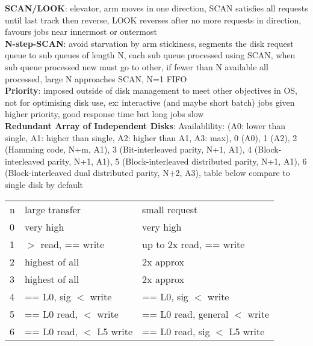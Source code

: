 \documentclass[a4paper]{article}
\begin{document}
\begin{multicols}{2}
        \textbf{SCAN/LOOK}: elevator, arm moves in one direction, SCAN satisfies all requests until last track then reverse, LOOK reverses after no more requests in direction, favours jobs near innermost or outermost\\
        \textbf{N-step-SCAN}: avoid starvation by arm stickiness, segments the disk request queue to sub queues of length N, each sub queue processed using SCAN, when sub queue processed new must go to other, if fewer than N available all processed, large N approaches SCAN, N=1 FIFO\\
        \textbf{Priority}: imposed outside of disk management to meet other objectives in OS, not for optimising disk use, ex: interactive (and maybe short batch) jobs given higher priority, good response time but long jobs slow\\
        \textbf{Redundant Array of Independent Disks}: Availablility: (A0: lower than single, A1: higher than single, A2: higher than A1, A3: max), 0 (A0), 1 (A2), 2 (Hamming code, N+m, A1), 3 (Bit-interleaved parity, N+1, A1), 4 (Block-interleaved parity, N+1, A1), 5 (Block-interleaved distributed parity, N+1, A1), 6 (Block-interleaved dual distributed parity, N+2, A3), table below compare to single disk by default\\
        \begin{tabular}{l l l}
            n & large transfer & small request\\
            0 & very high & very high\\
            1 & $>$ read, == write & up to 2x read, == write\\
            2 & highest of all & 2x approx\\
            3 & highest of all & 2x approx\\
            4 & == L0, sig $<$ write & == L0, sig $<$ write\\
            5 & == L0 read, $<$ write & == L0 read, general $<$ write\\
            6 & == L0 read, $<$ L5 write & == L0 read, sig $<$ L5 write\\
        \end{tabular}
    \end{multicols}
    
\end{document}
